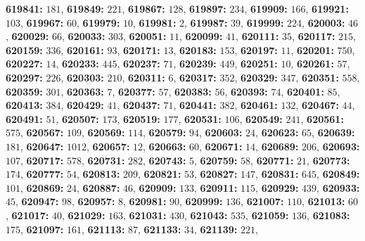 \textsf{\bfseries 619841:} $181$, \textsf{\bfseries 619849:} $221$, \textsf{\bfseries 619867:} $128$, \textsf{\bfseries 619897:} $234$, \textsf{\bfseries 619909:} $166$, \textsf{\bfseries 619921:} $103$, \textsf{\bfseries 619967:} $60$, \textsf{\bfseries 619979:} $10$, \textsf{\bfseries 619981:} $2$, \textsf{\bfseries 619987:} $39$, \textsf{\bfseries 619999:} $224$, \textsf{\bfseries 620003:} $46$, \textsf{\bfseries 620029:} $66$, \textsf{\bfseries 620033:} $303$, \textsf{\bfseries 620051:} $11$, \textsf{\bfseries 620099:} $41$, \textsf{\bfseries 620111:} $35$, \textsf{\bfseries 620117:} $215$, \textsf{\bfseries 620159:} $336$, \textsf{\bfseries 620161:} $93$, \textsf{\bfseries 620171:} $13$, \textsf{\bfseries 620183:} $153$, \textsf{\bfseries 620197:} $11$, \textsf{\bfseries 620201:} $750$, \textsf{\bfseries 620227:} $14$, \textsf{\bfseries 620233:} $445$, \textsf{\bfseries 620237:} $71$, \textsf{\bfseries 620239:} $449$, \textsf{\bfseries 620251:} $10$, \textsf{\bfseries 620261:} $57$, \textsf{\bfseries 620297:} $226$, \textsf{\bfseries 620303:} $210$, \textsf{\bfseries 620311:} $6$, \textsf{\bfseries 620317:} $352$, \textsf{\bfseries 620329:} $347$, \textsf{\bfseries 620351:} $558$, \textsf{\bfseries 620359:} $301$, \textsf{\bfseries 620363:} $7$, \textsf{\bfseries 620377:} $57$, \textsf{\bfseries 620383:} $56$, \textsf{\bfseries 620393:} $74$, \textsf{\bfseries 620401:} $85$, \textsf{\bfseries 620413:} $384$, \textsf{\bfseries 620429:} $41$, \textsf{\bfseries 620437:} $71$, \textsf{\bfseries 620441:} $382$, \textsf{\bfseries 620461:} $132$, \textsf{\bfseries 620467:} $44$, \textsf{\bfseries 620491:} $51$, \textsf{\bfseries 620507:} $173$, \textsf{\bfseries 620519:} $177$, \textsf{\bfseries 620531:} $106$, \textsf{\bfseries 620549:} $241$, \textsf{\bfseries 620561:} $575$, \textsf{\bfseries 620567:} $109$, \textsf{\bfseries 620569:} $114$, \textsf{\bfseries 620579:} $94$, \textsf{\bfseries 620603:} $24$, \textsf{\bfseries 620623:} $65$, \textsf{\bfseries 620639:} $181$, \textsf{\bfseries 620647:} $1012$, \textsf{\bfseries 620657:} $12$, \textsf{\bfseries 620663:} $60$, \textsf{\bfseries 620671:} $14$, \textsf{\bfseries 620689:} $206$, \textsf{\bfseries 620693:} $107$, \textsf{\bfseries 620717:} $578$, \textsf{\bfseries 620731:} $282$, \textsf{\bfseries 620743:} $5$, \textsf{\bfseries 620759:} $58$, \textsf{\bfseries 620771:} $21$, \textsf{\bfseries 620773:} $174$, \textsf{\bfseries 620777:} $54$, \textsf{\bfseries 620813:} $209$, \textsf{\bfseries 620821:} $53$, \textsf{\bfseries 620827:} $147$, \textsf{\bfseries 620831:} $645$, \textsf{\bfseries 620849:} $101$, \textsf{\bfseries 620869:} $24$, \textsf{\bfseries 620887:} $46$, \textsf{\bfseries 620909:} $133$, \textsf{\bfseries 620911:} $115$, \textsf{\bfseries 620929:} $439$, \textsf{\bfseries 620933:} $45$, \textsf{\bfseries 620947:} $98$, \textsf{\bfseries 620957:} $8$, \textsf{\bfseries 620981:} $90$, \textsf{\bfseries 620999:} $136$, \textsf{\bfseries 621007:} $110$, \textsf{\bfseries 621013:} $60$, \textsf{\bfseries 621017:} $40$, \textsf{\bfseries 621029:} $163$, \textsf{\bfseries 621031:} $430$, \textsf{\bfseries 621043:} $535$, \textsf{\bfseries 621059:} $136$, \textsf{\bfseries 621083:} $175$, \textsf{\bfseries 621097:} $161$, \textsf{\bfseries 621113:} $87$, \textsf{\bfseries 621133:} $34$, \textsf{\bfseries 621139:} $221$, 
